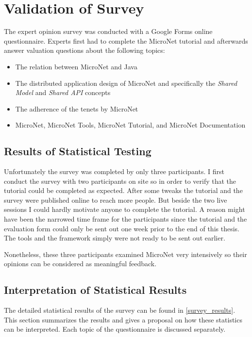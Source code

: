 \section{Validation of Survey}
\label{sec:validation_survey}

The expert opinion survey was conducted with a Google Forms online
questionnaire. Experts first had to complete the MicroNet tutorial and
afterwards answer valuation questions about the following topics:

\begin{itemize}
  \item The relation between MicroNet and Java
  \item The distributed application design of MicroNet and specifically the
  \textit{Shared Model} and \textit{Shared API} concepts
  \item The adherence of the \ms{} tenets by MicroNet
  \item MicroNet, MicroNet Tools, MicroNet Tutorial, and MicroNet Documentation
\end{itemize}

\subsection{Results of Statistical Testing}

Unfortunately the survey was completed by only three participants. I first
conduct the survey with two participants on site so in order to verify that the
tutorial could be completed as expected. After some tweaks the tutorial and the
survey were published online to reach more people. But beside the two live
sessions I could hardly motivate anyone to complete the tutorial. A reason might
have been the narrowed time frame for the participants since the tutorial and
the evaluation form could only be sent out one week prior to the end of this
thesis. The tools and the framework simply were not ready to be sent out
earlier.

Nonetheless, these three participants examined MicroNet very intensively so
their opinions can be considered as meaningful feedback.

\subsection{Interpretation of Statistical Results}

The detailed statistical results of the survey can be found in
\autoref{survey_results}. This section summarizes the results and gives a
proposal on how these statistics can be interpreted. Each topic of the
questionnaire is discussed separately.

